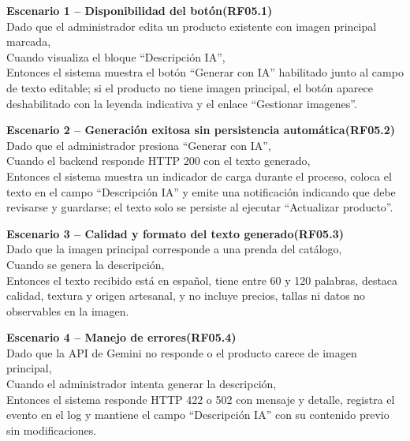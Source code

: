 \documentclass[12pt,a4paper]{article}
\begin{document}
\textbf{Escenario 1 -- Disponibilidad del botón(RF05.1)}\\
Dado que el administrador edita un producto existente con imagen principal marcada,\\
Cuando visualiza el bloque ``Descripción IA'',\\
Entonces el sistema muestra el botón ``Generar con IA'' habilitado junto al campo de texto editable; si el producto no tiene imagen principal, el botón aparece deshabilitado con la leyenda indicativa y el enlace ``Gestionar imagenes''.

\vspace{0.3em}

\textbf{Escenario 2 -- Generación exitosa sin persistencia automática(RF05.2)}\\
Dado que el administrador presiona ``Generar con IA'',\\
Cuando el backend responde HTTP 200 con el texto generado,\\
Entonces el sistema muestra un indicador de carga durante el proceso, coloca el texto en el campo ``Descripción IA'' y emite una notificación indicando que debe revisarse y guardarse; el texto solo se persiste al ejecutar ``Actualizar producto''.

\vspace{0.3em}

\textbf{Escenario 3 -- Calidad y formato del texto generado(RF05.3)}\\
Dado que la imagen principal corresponde a una prenda del catálogo,\\
Cuando se genera la descripción,\\
Entonces el texto recibido está en español, tiene entre 60 y 120 palabras, destaca calidad, textura y origen artesanal, y no incluye precios, tallas ni datos no observables en la imagen.

\vspace{0.3em}

\textbf{Escenario 4 -- Manejo de errores(RF05.4)}\\
Dado que la API de Gemini no responde o el producto carece de imagen principal,\\
Cuando el administrador intenta generar la descripción,\\
Entonces el sistema responde HTTP 422 o 502 con mensaje y detalle, registra el evento en el log y mantiene el campo ``Descripción IA'' con su contenido previo sin modificaciones.

\end{document}

